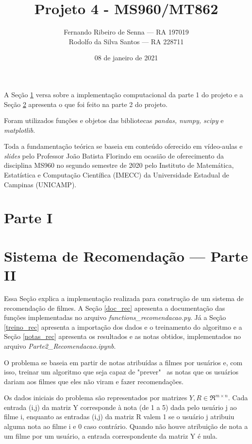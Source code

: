 \documentclass[12pt]{article}
\title{Projeto 4 - MS960/MT862}
\author{Fernando Ribeiro de Senna --- RA 197019\\
Rodolfo da Silva Santos --- RA 228711}
\date{08 de janeiro de 2021}
\begin{document}
\maketitle

A Seção \ref{parte1} versa sobre a implementação computacional da parte 1 do projeto e a Seção \ref{parte2} apresenta o que foi feito na parte 2 do projeto.

Foram utilizados funções e objetos das bibliotecas \textit{pandas, numpy, scipy} e \textit{matplotlib}. 

Toda a fundamentação teórica se baseia em conteúdo oferecido em vídeo-aulas e \textit{slides} pelo Professor João Batista Florindo em ocasião de oferecimento da disciplina MS960 no segundo semestre de 2020 pelo Instituto de Matemática, Estatística e Computação Científica (IMECC) da Universidade Estadual de Campinas (UNICAMP).




\section{Parte I} \label{parte1}


\section{Sistema de Recomendação --- Parte II} \label{parte2}

Essa Seção explica a implementação realizada para construção de um sistema de recomendação de filmes. A Seção \ref{doc_rec} apresenta a documentação das funções implementadas no arquivo \textit{functions\_recomendacao.py}. Já a Seção \ref{treino_rec} apresenta a importação dos dados e o treinamento do algoritmo e a Seção \ref{notas_rec} apresenta os resultados e as notas obtidos, implementados no arquivo \textit{Parte2\_Recomendacao.ipynb}.

O problema se baseia em partir de notas atribuídas a filmes por usuários e, com isso, treinar um algoritmo que seja capaz de "prever" \ as notas que os usuários dariam aos filmes que eles não viram e fazer recomendações.

Os dados iniciais do problema são representados por matrizes $Y, R \in \Re^{m \times n}$. Cada entrada (i,j) da matriz Y corresponde à nota (de 1 a 5) dada pelo usuário j ao filme i, enquanto as entradas (i,j) da matriz R valem 1 se o usuário j atribuiu alguma nota ao filme i e 0 caso contrário. Quando não houve atribuição de nota a um filme por um usuário, a entrada correspondente da matriz Y é nula.
\end{document}
